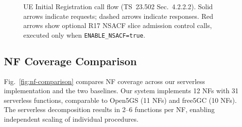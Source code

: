 \begin{figure}[t]
\caption{UE Initial Registration call flow (TS~23.502 Sec.~4.2.2.2). Solid arrows indicate requests; dashed arrows indicate responses. Red arrows show optional R17 NSACF slice admission control calls, executed only when \texttt{ENABLE\_NSACF=true}.}
\label{fig:regflow}
\end{figure}

\subsection{NF Coverage Comparison}

Fig.~\ref{fig:nf-comparison} compares NF coverage across our serverless implementation and the two baselines. Our system implements 12 NFs with 31 serverless functions, comparable to Open5GS (11 NFs) and free5GC (10 NFs). The serverless decomposition results in 2--6 functions per NF, enabling independent scaling of individual procedures.

